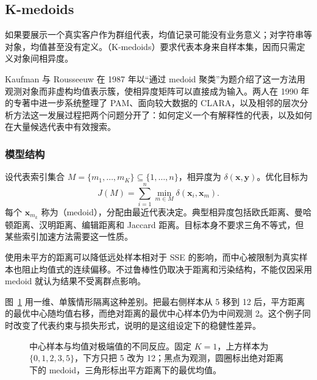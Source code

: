\subsection{K-medoids}
\label{sec:clustering-kmedoids}

如果要展示一个真实客户作为群组代表，均值记录可能没有业务意义；对字符串等对象，均值甚至没有定义。（K-medoids）要求代表本身来自样本集，因而只需定义对象间相异度。

Kaufman 与 Rousseeuw 在 1987 年以“通过 medoid 聚类”为题介绍了这一方法用观测对象而非虚构均值表示簇，使相异度矩阵可以直接成为输入。两人在 1990 年的专著中进一步系统整理了 PAM、面向较大数据的 CLARA，以及相邻的层次分析方法这一发展过程把两个问题分开了：如何定义一个有解释性的代表，以及如何在大量候选代表中有效搜索。

\subsubsection{模型结构}

设代表索引集合 $M=\{m_1,\ldots,m_K\}\subseteq\{1,\ldots,n\}$，相异度为 $\delta(\bm{x},\bm{y})$。优化目标为
\begin{equation}
 J(M)=\sum_{i=1}^n\min_{m\in M}\delta(\bm{x}_i,\bm{x}_m).
 \label{eq:clustering-medoids}
\end{equation}
每个 $\bm{x}_{m_k}$ 称为（medoid），分配由最近代表决定。典型相异度包括欧氏距离、曼哈顿距离、汉明距离、编辑距离和 Jaccard 距离。目标本身不要求三角不等式，但某些索引加速方法需要这一性质。

使用未平方的距离可以降低远处样本相对于 SSE 的影响，而中心被限制为真实样本也阻止均值式的连续偏移。不过鲁棒性仍取决于距离和污染结构，不能仅因采用 medoid 就认为结果不受离群点影响。

图~\ref{fig:clustering-medoid-robustness} 用一维、单簇情形隔离这种差别。把最右侧样本从 5 移到 12 后，平方距离的最优中心随均值右移，而绝对距离的最优中心样本仍为中间观测 2。这个例子同时改变了代表约束与损失形式，说明的是这组设定下的稳健性差异。

\Needspace{75mm}
\begin{figure}[htbp]
 \centering
 
 \caption{中心样本与均值对极端值的不同反应。固定 $K=1$，上方样本为 $\{0,1,2,3,5\}$，下方只把 5 改为 12；黑点为观测，圆圈标出绝对距离下的 medoid，三角形标出平方距离下的最优均值。}
 \label{fig:clustering-medoid-robustness}
\end{figure}

